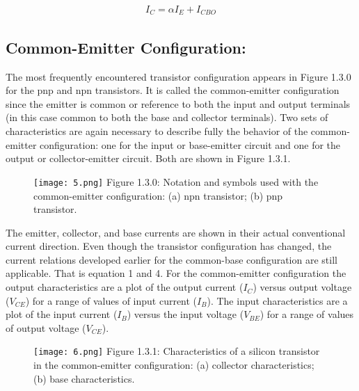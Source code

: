 \begin{ceqn}
\begin{align}
I_{C} = \alpha I_{E} + I_{CBO}
\end{align}
\end{ceqn}

\pagebreak

\subsection{Common-Emitter Configuration:}

The most frequently encountered transistor configuration appears in Figure 1.3.0 for the pnp and npn transistors. It is called the common-emitter configuration since the emitter is common or reference to both the input and output terminals (in this case common to both the base and collector terminals). Two sets of characteristics are again necessary to describe fully the behavior of the common-emitter configuration: one for the input or base-emitter circuit and one for the output or collector-emitter circuit. Both are shown in Figure 1.3.1.

\begin{figure}[H]
\texttt{[image: 5.png]}
\centering \linebreak \linebreak Figure 1.3.0: Notation and symbols used with the common-emitter configuration: (a) npn transistor; (b) pnp transistor.
\end{figure}

The emitter, collector, and base currents are shown in their actual conventional current direction. Even though the transistor configuration has changed, the current relations developed earlier for the common-base configuration are still applicable. That is equation 1 and 4. For the common-emitter configuration the output characteristics are a plot of the output current ($I_{C}$) versus output voltage ($V_{CE}$) for a range of values of input current ($I_{B}$). The input characteristics are a plot of the input current ($I_{B}$) versus the input voltage ($V_{BE}$) for a range of values of output voltage ($V_{CE}$).

\begin{figure}[H]
\texttt{[image: 6.png]}
\centering \linebreak \linebreak Figure 1.3.1: Characteristics of a silicon transistor in the common-emitter configuration: (a) collector characteristics; (b) base characteristics.
\end{figure}

